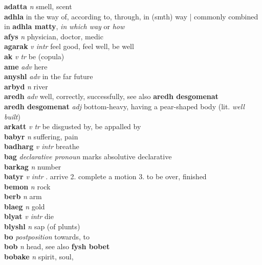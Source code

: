 \textbf{adatta}   \emph{n} \textperiodcentered smell, scent\\\textbf{adhla}    \textperiodcentered in the way of, according to, through, in (smth) way | commonly combined in \textbf{adhla matty}, \emph{in which way} or \emph{how}\\\textbf{afys}   \emph{n} \textperiodcentered physician, doctor, medic\\\textbf{agarak}   \emph{v intr} \textperiodcentered feel good, feel well, be well\\\textbf{ak}   \emph{v tr} \textperiodcentered be (copula)\\\textbf{ame}   \emph{adv} \textperiodcentered here\\\textbf{anyshl}   \emph{adv} \textperiodcentered in the far future\\\textbf{arbyd}   \emph{n} \textperiodcentered river\\\textbf{aredh}   \emph{adv} \textperiodcentered well, correctly, successfully, see also \textbf{aredh desgomenat}\\\textbf{aredh desgomenat}   \emph{adj} \textperiodcentered bottom-heavy, having a pear-shaped body (lit. \emph{well built})\\\textbf{arkatt}   \emph{v tr} \textperiodcentered be disgusted by, be appalled by\\\textbf{babyr}   \emph{n} \textperiodcentered suffering, pain\\\textbf{badharg}   \emph{v intr} \textperiodcentered breathe\\\textbf{bag}   \emph{declarative pronoun} \textperiodcentered marks absolutive declarative\\\textbf{barkag}   \emph{n} \textperiodcentered number\\\textbf{batyr}   \emph{v intr} . arrive 2. complete a motion 3. to be over, finished \\\textbf{bemon}   \emph{n} \textperiodcentered rock\\\textbf{berb}   \emph{n} \textperiodcentered arm\\\textbf{blaeg}   \emph{n} \textperiodcentered gold\\\textbf{blyat}   \emph{v intr} \textperiodcentered die\\\textbf{blyshl}   \emph{n} \textperiodcentered sap (of plunts)\\\textbf{bo}   \emph{postposition} \textperiodcentered towards, to\\\textbf{bob}   \emph{n} \textperiodcentered head, see also \textbf{fysh bobet}\\\textbf{bobake}   \emph{n} \textperiodcentered spirit, soul, 